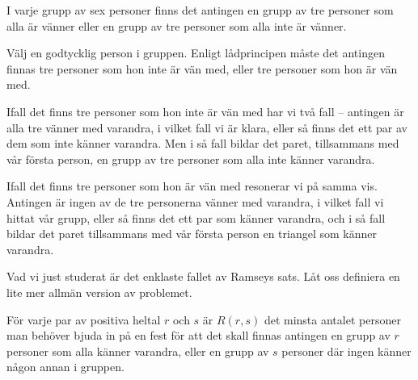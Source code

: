 \documentclass[nobib]{tufte-handout}
\begin{document}
\begin{example}\label{example_R33_is_6}
  I varje grupp av sex personer finns det antingen en grupp av tre personer som alla är vänner eller en grupp av tre personer som alla inte är vänner.

  Välj en godtycklig person i gruppen. Enligt lådprincipen måste det antingen finnas tre personer som hon inte är vän med, eller tre personer som hon är vän med.

  Ifall det finns tre personer som hon inte är vän med har vi två fall -- antingen är alla tre vänner med varandra, i vilket fall vi är klara, eller så finns det ett par av dem som inte känner varandra. Men i så fall bildar det paret, tillsammans med vår första person, en grupp av tre personer som alla inte känner varandra.

  Ifall det finns tre personer som hon är vän med resonerar vi på samma vis. Antingen är ingen av de tre personerna vänner med varandra, i vilket fall vi hittat vår grupp, eller så finns det ett par som känner varandra, och i så fall bildar det paret tillsammans med vår första person en triangel som känner varandra.
\end{example}

Vad vi just studerat är det enklaste fallet av Ramseys sats. Låt oss definiera en lite mer allmän version av problemet.

\begin{definition}
  För varje par av positiva heltal $r$ och $s$ är $R(r,s)$ det minsta antalet personer man behöver bjuda in på en fest för att det skall finnas antingen en grupp av $r$ personer som alla känner varandra, eller en grupp av $s$ personer där ingen känner någon annan i gruppen.
\end{definition}
\end{document}
